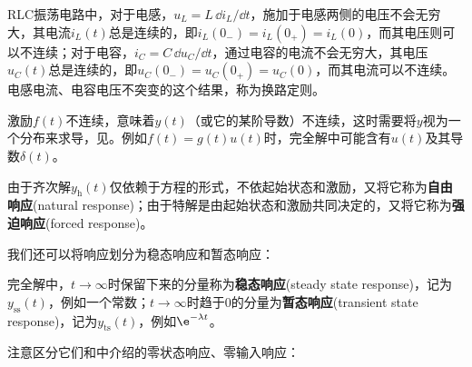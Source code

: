 \begin{example}[换路定则]
    RLC振荡电路中，对于电感，$u_L=L\,\dd i_L/\dd t$，施加于电感两侧的电压不会无穷大，其电流$i_L(t)$总是连续的，即$i_L(0_-)=i_L(0_+)=i_L(0)$，而其电压则可以不连续；对于电容，$i_C=C\,\dd u_C/\dd t$，通过电容的电流不会无穷大，其电压$u_C(t)$总是连续的，即$u_C(0_-)=u_C(0_+)=u_C(0)$，而其电流可以不连续。电感电流、电容电压不突变的这个结果，称为换路定则。
\end{example}

激励$f(t)$不连续，意味着$y(t)$（或它的某阶导数）不连续，这时需要将$y$视为一个分布来求导，见。例如$f(t)=g(t)u(t)$时，完全解中可能含有$u(t)$及其导数$\delta(t)$。

\begin{definition}[自由响应与强迫响应]
    由于齐次解$y_{\text{h}}(t)$仅依赖于方程的形式，不依起始状态和激励，又将它称为\textbf{自由响应}(natural response)；由于特解是由起始状态和激励共同决定的，又将它称为\textbf{强迫响应}(forced response)。
\end{definition}

我们还可以将响应划分为稳态响应和暂态响应：
\begin{definition}[稳态响应和暂态响应]
    完全解中，$t\to\infty$时保留下来的分量称为\textbf{稳态响应}(steady state response)，记为$y_{\text{ss}}(t)$，例如一个常数；$t\to\infty$时趋于$0$的分量为\textbf{暂态响应}(transient state response)，记为$y_{\text{ts}}(t)$，例如$\e^{-\lambda t}$。
\end{definition}

注意区分它们和中介绍的零状态响应、零输入响应：

